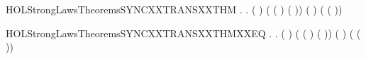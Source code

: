 \newcommand{\HOLStrongLawsTheoremsSYNCXXINDUCT}{\UseVerbatim{HOLStrongLawsTheoremsSYNCXXINDUCT}}
\begin{SaveVerbatim}{HOLStrongLawsTheoremsSYNCXXTRANSXXTHM}
\HOLTokenTurnstile{} \HOLSymConst{\HOLTokenForall{}}     .
            \HOLTokenTransBegin{}\HOLTokenTransEnd {} \HOLSymConst{\HOLTokenImp{}}
       \HOLSymConst{\HOLTokenExists{}} .
            \HOLSymConst{\HOLTokenLeq{}}  \HOLSymConst{\HOLTokenConj{}} ( \HOLSymConst{=}  ) \HOLSymConst{\HOLTokenConj{}}
           ( ( ) \HOLSymConst{=}  ( )) \HOLSymConst{\HOLTokenConj{}} ( \HOLSymConst{=} \HOLConst{\ensuremath{\tau}}) \HOLSymConst{\HOLTokenConj{}}
           ( \HOLSymConst{=}  \HOLSymConst{\ensuremath{\parallel}}  ( ))
\end{SaveVerbatim}
\newcommand{\HOLStrongLawsTheoremsSYNCXXTRANSXXTHM}{\UseVerbatim{HOLStrongLawsTheoremsSYNCXXTRANSXXTHM}}
\begin{SaveVerbatim}{HOLStrongLawsTheoremsSYNCXXTRANSXXTHMXXEQ}
\HOLTokenTurnstile{} \HOLSymConst{\HOLTokenForall{}}     .
            \HOLTokenTransBegin{}\HOLTokenTransEnd {} \HOLSymConst{\HOLTokenEquiv{}}
       \HOLSymConst{\HOLTokenExists{}} .
            \HOLSymConst{\HOLTokenLeq{}}  \HOLSymConst{\HOLTokenConj{}} ( \HOLSymConst{=}  ) \HOLSymConst{\HOLTokenConj{}}
           ( ( ) \HOLSymConst{=}  ( )) \HOLSymConst{\HOLTokenConj{}} ( \HOLSymConst{=} \HOLConst{\ensuremath{\tau}}) \HOLSymConst{\HOLTokenConj{}}
           ( \HOLSymConst{=}  \HOLSymConst{\ensuremath{\parallel}}  ( ))
\end{SaveVerbatim}
\newcommand{\HOLStrongLawsTheoremsSYNCXXTRANSXXTHMXXEQ}{\UseVerbatim{HOLStrongLawsTheoremsSYNCXXTRANSXXTHMXXEQ}}
